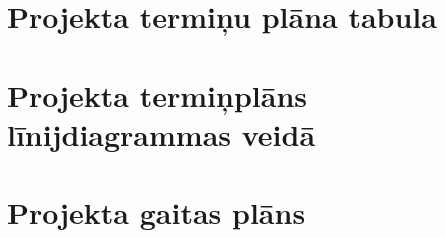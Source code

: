 \section{Projekta termiņu plāna tabula}
	\label{app:Projekta_terminu_plans}
    \begin{figure}
        
    \end{figure}
    \clearpage
    \begin{figure}
        
    \end{figure}
    \clearpage
    \begin{figure}
        
    \end{figure}
    \clearpage
    \begin{figure}
        
    \end{figure}
    \clearpage
    \begin{figure}
        
    \end{figure}
    \clearpage
    \begin{figure}
        
    \end{figure}
    \clearpage
\section{Projekta termiņplāns līnijdiagrammas veidā}
    \label{app:Projekta_linijdiagrammas}
    
\section{Projekta gaitas plāns}
	\label{app:Projekta_gaitas_plans}
    
